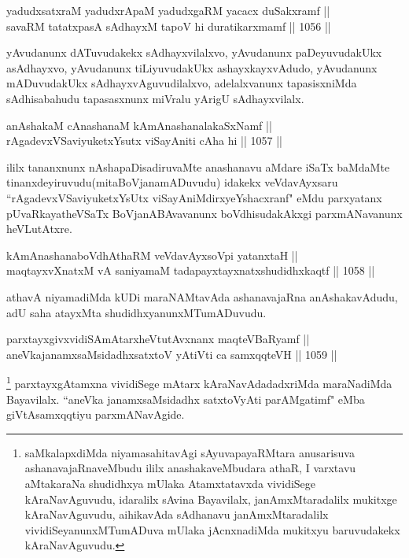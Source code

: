 \begin{shl}
yadudxsatxraM yadudxrApaM yadudxgaRM yacacx duSakxramf || \\
savaRM tatatxpasA sAdhayxM tapoV hi duratikarxmamf \hfill || 1056 ||  
\end{shl}

\begin{artha}
yAvudanunx dATuvudakekx sAdhayxvilalxvo, yAvudanunx paDeyuvudakUkx asAdhayxvo, yAvudanunx tiLiyuvudakUkx ashayxkayxvAdudo, yAvudanunx mADuvudakUkx sAdhayxvAguvudilalxvo, adelalxvanunx tapasisxniMda sAdhisabahudu tapasasxnunx miVralu yArigU sAdhayxvilalx.
\end{artha}


\begin{shl}
anAshakaM cAnashanaM kAmAnashanalakaSxNamf ||  \\
rAgadevxVSaviyuketxYsutx viSayAniti cA\s \s ha hi \hfill || 1057 ||  
\end{shl}
				
\begin{artha}
ililx tananxnunx nAshapaDisadiruvaMte anashanavu aMdare iSaTx baMdaMte tinanxdeyiruvudu(mitaBoVjanamADuvudu) idakekx veVdavAyxsaru ``rAgadevxVSaviyuketxYsUtx viSayAniMdirxyeYshacxranf" eMdu parxyatanx pUvaRkayatheVSaTx BoVjanABAvavanunx boVdhisudakAkxgi parxmANavanunx heVLutAtxre.
\end{artha}				
				
\begin{shl}
kAmAnashanaboVdhAthaRM veVdavAyxsoV\s pi yatanxtaH || \\
maqtayxvXnatxM vA saniyamaM tadapayxtayxnatxshudidhxkaqtf \hfill || 1058 ||  
\end{shl}

\begin{artha}
athavA niyamadiMda kUDi maraNAMtavAda ashanavajaRna anAshakavAdudu, adU saha atayxMta shudidhxyanunxMTumADuvudu.
\end{artha}

\begin{shl}
parxtayxgivxvidiSAmAtarxheVtutAvxnanx maqteVBaRyamf ||  \\
aneVkajanamxsaMsidadhxsatxtoV yAtiVti ca samxqqteVH \hfill || 1059 ||  
\end{shl}

\begin{artha}
\footnote{saMkalapxdiMda niyamasahitavAgi sAyuvapayaRMtara anusarisuva ashanavajaRnaveMbudu ililx anashakaveMbudara athaR, I varxtavu aMtakaraNa shudidhxya mUlaka Atamxtatavxda vividiSege kAraNavAguvudu, idaralilx sAvina Bayavilalx, janAmxMtaradalilx mukitxge kAraNavAguvudu, aihikavAda sAdhanavu janAmxMtaradalilx vividiSeyanunxMTumADuva mUlaka jAcnxnadiMda mukitxyu baruvudakekx kAraNavAguvudu.} parxtayxgAtamxna vividiSege mAtarx kAraNavAdadadxriMda maraNadiMda Bayavilalx. ``aneVka janamxsaMsidadhx satxtoVyAti parAMgatimf" eMba giVtAsamxqqtiyu parxmANavAgide.
\end{artha}

